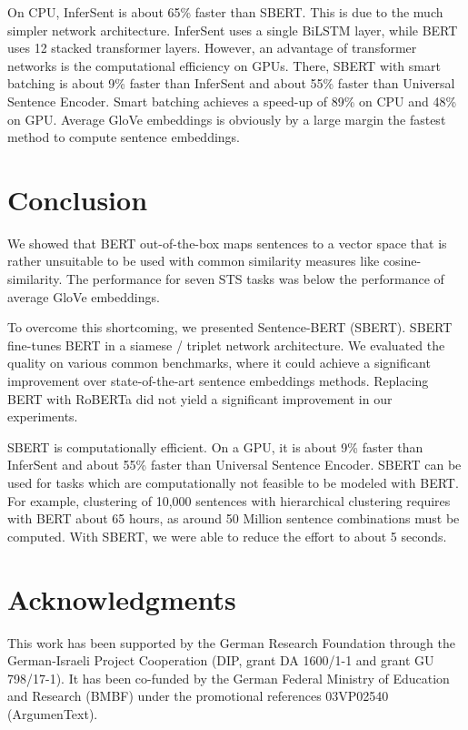 \documentclass[11pt,a4paper]{article}
\begin{document}
On CPU, InferSent is about 65\% faster than SBERT. This is due to the much simpler network architecture. InferSent uses a single Bi\-LSTM layer, while BERT uses 12 stacked transformer layers. However, an advantage of transformer networks is the computational efficiency on GPUs. There, SBERT with smart batching is about 9\% faster than InferSent and about  55\% faster than Universal Sentence Encoder. Smart batching achieves a speed-up of 89\% on CPU and 48\% on GPU. Average GloVe embeddings is obviously by a large margin the fastest method to compute sentence embeddings. 

\section{Conclusion}
We showed that BERT out-of-the-box maps sentences to a vector space that is rather unsuitable to be used with common similarity measures like cosine-similarity. The performance for seven STS tasks was below the performance of average GloVe embeddings. 

To overcome this shortcoming, we presented Sentence-BERT (SBERT). SBERT fine-tunes BERT in a siamese / triplet network architecture. We evaluated the quality on various common benchmarks, where it could achieve a significant improvement over state-of-the-art sentence embeddings methods. Replacing BERT with RoBERTa did not yield a significant improvement in our experiments.


SBERT is computationally efficient. On a GPU, it is about 9\% faster than InferSent and about 55\% faster than Universal Sentence Encoder. SBERT can be used for tasks which are computationally not feasible to be modeled with BERT. For example, clustering of 10,000 sentences with hierarchical clustering requires with BERT about 65 hours, as around 50 Million sentence combinations must be computed. With SBERT, we were able to reduce the effort to about 5 seconds.  




\section*{Acknowledgments}
This work has been supported by the German Research Foundation through the German-Israeli Project Cooperation (DIP, grant DA 1600/1-1 and grant GU 798/17-1). It has been co-funded by the German Federal Ministry of Education and Research (BMBF) under the promotional references 03VP02540 (ArgumenText).



\end{document}
